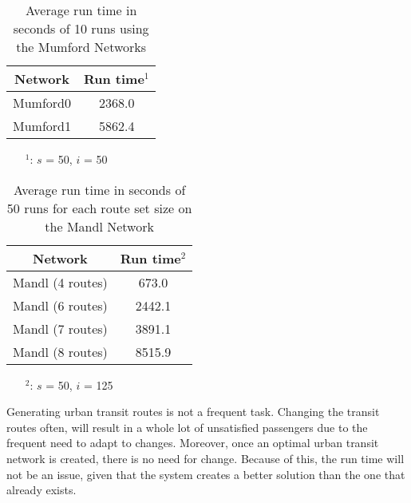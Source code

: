
\begin{table}[H]
    \centering
    \hspace*{-1.0cm}
    \begin{tabular}{|c|c|}
        \hline
        \textbf{Network} & \textbf{Run time$^1$ } \\
        \hline
        Mumford0 & 2368.0\\
        
        Mumford1 & 5862.4\\
        \hline
    \end{tabular}
    \caption{Average run time in seconds of 10 runs using the Mumford Networks}
    \label{tabel:runTimeMumford}
    \begin{itemize}[noitemsep]
    \item[$^1$:] $s$ = 50, $i$ = 50
    \end{itemize} 
\end{table}

\begin{table}[H]
    \centering
    \hspace*{-1.0cm}
    \begin{tabular}{|c|c|}
        \hline
        \textbf{Network} & \textbf{Run time$^2$}\\
        \hline
        Mandl (4 routes) & 673.0\\
        
        Mandl (6 routes) & 2442.1\\
      
        Mandl (7 routes) & 3891.1\\
       
        Mandl (8 routes) & 8515.9\\
        \hline
    \end{tabular}
    \caption{Average run time in seconds of 50 runs for each route set size on the Mandl Network}
    \begin{itemize}[noitemsep]
    \item[$^2$:] $s$ = 50, $i$ = 125
    \end{itemize} 
    \label{tabel:runTimeMandl}
\end{table}

Generating urban transit routes is not a frequent task. Changing the transit routes often, will result in a whole lot of unsatisfied passengers due to the frequent need to adapt to changes. Moreover, once an optimal urban transit network is created, there is no need for change. Because of this, the run time will not be an issue, given that the system creates a better solution than the one that already exists. 